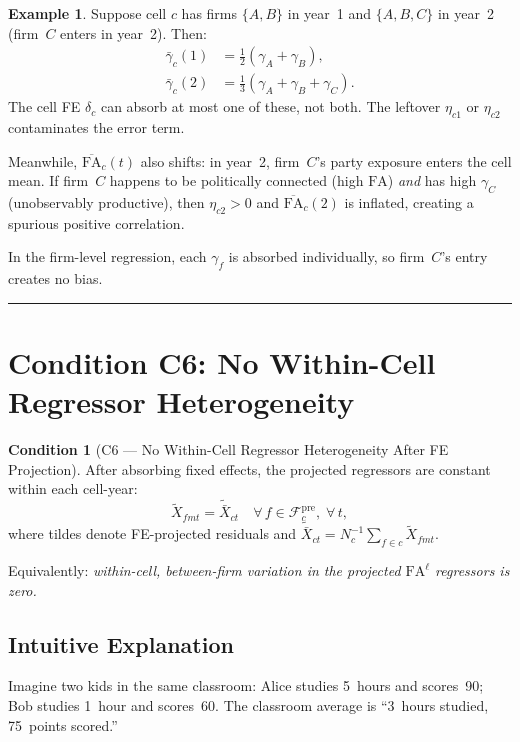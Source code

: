 \documentclass{article}
\newcommand{\FA}{\mathrm{FA}}
\newcommand{\cFpre}{\mathcal{F}^{\mathrm{pre}}}
\theoremstyle{plain}
\theoremstyle{definition}
\newtheorem{condition}{Condition}
\newtheorem{example}{Example}
\begin{document}
\begin{example}
Suppose cell $c$ has firms $\{A, B\}$ in year~1 and $\{A, B, C\}$ in year~2
(firm~$C$ enters in year~2).  Then:
\begin{align*}
  \bar\gamma_c(1) &= \tfrac{1}{2}(\gamma_A + \gamma_B), \\
  \bar\gamma_c(2) &= \tfrac{1}{3}(\gamma_A + \gamma_B + \gamma_C).
\end{align*}
The cell FE $\delta_c$ can absorb at most one of these, not both.  The leftover
$\eta_{c1}$ or $\eta_{c2}$ contaminates the error term.

Meanwhile, $\overline{\FA}_{c}(t)$ also shifts: in year~2, firm~$C$'s party
exposure enters the cell mean.  If firm~$C$ happens to be politically connected
(high $\FA$) \emph{and} has high $\gamma_C$ (unobservably productive), then
$\eta_{c2} > 0$ and $\overline{\FA}_{c}(2)$ is inflated, creating a spurious
positive correlation.

In the firm-level regression, each $\gamma_f$ is absorbed individually, so
firm~$C$'s entry creates no bias.
\end{example}

\bigskip
\hrule
\bigskip

\section{Condition C6: No Within-Cell Regressor Heterogeneity}

\begin{condition}[C6 --- No Within-Cell Regressor Heterogeneity After FE
Projection]
After absorbing fixed effects, the projected regressors are constant within
each cell-year:
\[
  \tilde{X}_{fmt} = \tilde{\bar{X}}_{ct}
  \quad \forall\, f \in \cFpre_c,\;\forall\, t,
\]
where tildes denote FE-projected residuals and
$\tilde{\bar{X}}_{ct} = N_c^{-1}\sum_{f \in c} \tilde{X}_{fmt}$.

Equivalently: \emph{within-cell, between-firm variation in the projected
$\FA^\ell$ regressors is zero.}
\end{condition}

\subsection{Intuitive Explanation}

Imagine two kids in the same classroom: Alice studies 5~hours and scores~90;
Bob studies 1~hour and scores~60.  The classroom average is ``3~hours studied,
75~points scored.''
\end{document}
